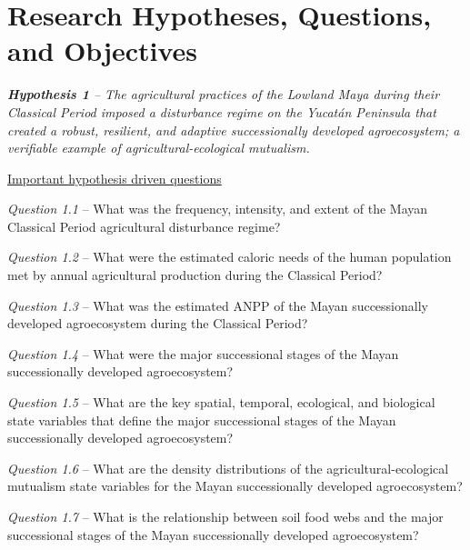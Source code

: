 \documentclass[twoside]{article}	%
\begin{document}
\section{Research Hypotheses, Questions, and Objectives}
\begin{description}
	\item{\textit{\textbf{Hypothesis 1} -- The agricultural practices of the Lowland Maya during their Classical Period imposed a disturbance regime on the Yucat\'{a}n Peninsula that created a robust, resilient, and adaptive successionally developed agroecosystem; a verifiable example of agricultural-ecological mutualism.}}
	
	\underline{Important hypothesis driven questions}
	\begin{description}
		\item{\textit{Question 1.1} -- What was the frequency, intensity, and extent of the Mayan Classical Period agricultural disturbance regime?}
		\item{\textit{Question 1.2} -- What were the estimated caloric needs of the human population met by annual agricultural production during the Classical Period?}
		\item{\textit{Question 1.3} -- What was the estimated ANPP of the Mayan successionally developed agroecosystem during the Classical Period?}
		\item{\textit{Question 1.4} -- What were the major successional stages of the Mayan successionally developed agroecosystem?}
		\item{\textit{Question 1.5} -- What are the key spatial, temporal, ecological, and biological state variables that define the major successional stages of the Mayan successionally developed agroecosystem?}
		\item{\textit{Question 1.6} --  What are the density distributions of the agricultural-ecological mutualism state variables for the Mayan successionally developed agroecosystem?}
		\item{\textit{Question 1.7} -- What is the relationship between soil food webs and the major successional stages of the Mayan successionally developed agroecosystem?}
	\end{description}
	

\end{description}
\end{document}

